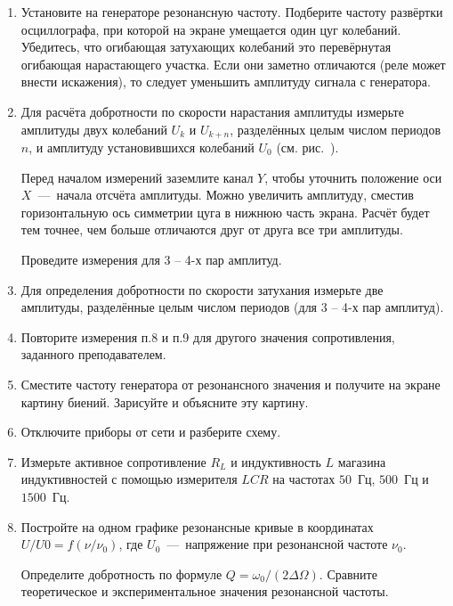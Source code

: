 \begin{lab:task}
\begin{enumerate}
	\item Установите на генераторе резонансную частоту. Подберите частоту
развёртки осциллографа, при которой на экране умещается один цуг
колебаний. Убедитесь, что огибающая затухающих колебаний это
перевёрнутая огибающая нарастающего участка. Если они заметно отличаются
(реле может внести искажения), то следует уменьшить амплитуду сигнала с
генератора.

	\item Для расчёта добротности по скорости нарастания амплитуды измерьте
амплитуды двух колебаний $U_k$ и $U_{k+n}$, разделённых целым числом периодов $n$,
и амплитуду установившихся колебаний $U_0$ (см. рис.~).

Перед началом измерений заземлите канал $Y$, чтобы уточнить положение оси
$X$~---~начала отсчёта амплитуды. Можно увеличить амплитуду, сместив
горизонтальную ось симметрии цуга в нижнюю часть экрана. Расчёт будет
тем точнее, чем больше отличаются друг от друга все три амплитуды.

Проведите измерения для 3 -- 4-х пар амплитуд.

	\item Для определения добротности по скорости затухания измерьте две
амплитуды, разделённые целым числом периодов (для 3 -- 4-х пар амплитуд).

	\item Повторите измерения п.8 и п.9 для другого значения сопротивления,
заданного преподавателем.

	\item Сместите частоту генератора от резонансного значения и получите на
экране картину биений. Зарисуйте и объясните эту картину.

	\item Отключите приборы от сети и разберите схему.

	\item Измерьте активное сопротивление $R_L$ и индуктивность $L$ магазина
индуктивностей с помощью измерителя $LCR$ на частотах $50$~Гц, $500$~Гц и $1500$~Гц.


	\item Постройте на одном графике резонансные кривые в координатах $U/U0 = f(
\nu/\nu_0)$, где $U_0$~---~напряжение при резонансной частоте $\nu_0$.

Определите добротность по формуле $Q = \omega_0/(2\Delta\Omega)$. Сравните теоретическое и
экспериментальное значения резонансной частоты.


\end{enumerate}
\end{lab:task}
